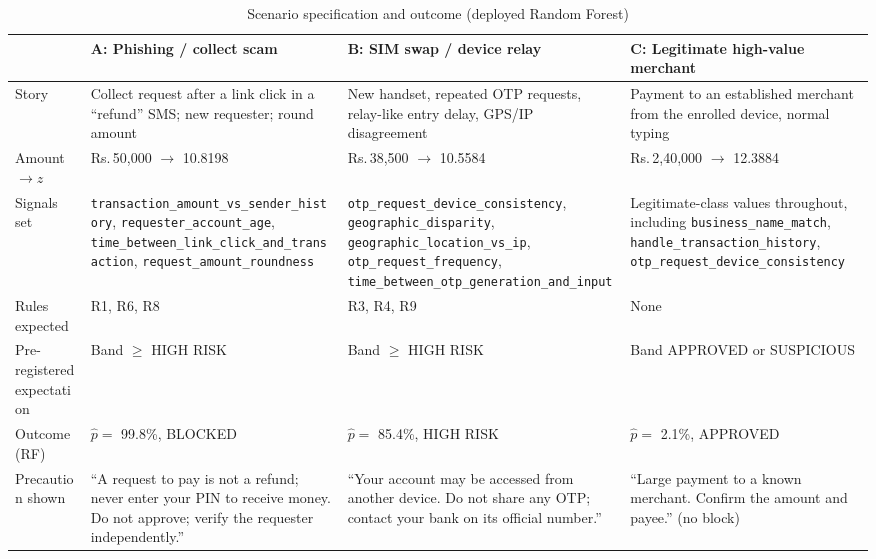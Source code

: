 \documentclass[conference]{IEEEtran}
\newcommand{\rupee}{Rs.\,}
\newcommand{\tabfont}{\footnotesize}
\begin{document}
\begin{table}[!t]
\caption{Scenario specification and outcome (deployed Random Forest)}\label{tab:usecase}
\centering\tabfont
\begin{tabularx}{\textwidth}{@{}l Y Y Y@{}}
\toprule
 & \textbf{A: Phishing / collect scam} & \textbf{B: SIM swap / device relay} & \textbf{C: Legitimate high-value merchant}\\
\midrule
Story & Collect request after a link click in a ``refund'' SMS; new requester; round amount & New handset, repeated OTP requests, relay-like entry delay, GPS/IP disagreement & Payment to an established merchant from the enrolled device, normal typing\\
Amount $\rightarrow z$ & \rupee 50,000 $\rightarrow$ 10.8198 & \rupee 38,500 $\rightarrow$ 10.5584 & \rupee 2,40,000 $\rightarrow$ 12.3884\\
Signals set & \texttt{transaction\_\allowbreak{}amount\_\allowbreak{}vs\_\allowbreak{}sender\_\allowbreak{}history}, \texttt{requester\_\allowbreak{}account\_\allowbreak{}age}, \texttt{time\_\allowbreak{}between\_\allowbreak{}link\_\allowbreak{}click\_\allowbreak{}and\_\allowbreak{}transaction}, \texttt{request\_\allowbreak{}amount\_\allowbreak{}roundness} & \texttt{otp\_\allowbreak{}request\_\allowbreak{}device\_\allowbreak{}consistency}, \texttt{geographic\_\allowbreak{}disparity}, \texttt{geographic\_\allowbreak{}location\_\allowbreak{}vs\_\allowbreak{}ip}, \texttt{otp\_\allowbreak{}request\_\allowbreak{}frequency}, \texttt{time\_\allowbreak{}between\_\allowbreak{}otp\_\allowbreak{}generation\_\allowbreak{}and\_\allowbreak{}input} & Legitimate-class values throughout, including \texttt{business\_\allowbreak{}name\_\allowbreak{}match}, \texttt{handle\_\allowbreak{}transaction\_\allowbreak{}history}, \texttt{otp\_\allowbreak{}request\_\allowbreak{}device\_\allowbreak{}consistency}\\
Rules expected & R1, R6, R8 & R3, R4, R9 & None\\
Pre-registered expectation & Band $\ge$ HIGH RISK & Band $\ge$ HIGH RISK & Band APPROVED or SUSPICIOUS\\
Outcome (RF) & $\hat p=$ 99.8\%, BLOCKED & $\hat p=$ 85.4\%, HIGH RISK & $\hat p=$ 2.1\%, APPROVED\\
Precaution shown & ``A request to pay is not a refund; never enter your PIN to receive money. Do not approve; verify the requester independently.'' & ``Your account may be accessed from another device. Do not share any OTP; contact your bank on its official number.'' & ``Large payment to a known merchant. Confirm the amount and payee.'' (no block)\\

\end{tabularx}
\end{table}
\end{document}
